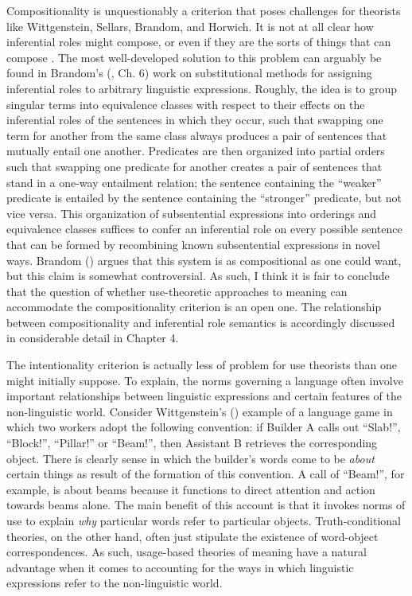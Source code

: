 Compositionality is unquestionably a criterion that poses challenges for theorists like Wittgenstein, Sellars, Brandom, and Horwich. It is not at all clear how inferential roles might compose, or even if they are the sorts of things that can compose \citep{FodorLepore:1991}. The most well-developed solution to this problem can arguably be found in Brandom's (\citeyear{Brandom:1994}, Ch. 6) work on substitutional methods for assigning inferential roles to arbitrary linguistic expressions. Roughly, the idea is to group singular terms into equivalence classes with respect to their effects on the inferential roles of the sentences in which they occur, such that swapping one term for another from the same class always produces a pair of sentences that mutually entail one another. Predicates are then organized into partial orders such that swapping one predicate for another creates a pair of sentences that stand in a one-way entailment relation; the sentence containing the ``weaker'' predicate is entailed by the sentence containing the ``stronger'' predicate, but not vice versa. This organization of subsentential expressions into orderings and equivalence classes suffices to confer an inferential role on every possible sentence that can be formed by recombining known subsentential expressions in novel ways. Brandom (\citeyear{Brandom:1994}) argues that this system is as compositional as one could want, but this claim is somewhat controversial. As such, I think it is fair to conclude that the question of whether use-theoretic approaches to meaning can accommodate the compositionality criterion is an open one. The relationship between compositionality and inferential role semantics is accordingly discussed in considerable detail in Chapter 4.

The intentionality criterion is actually less of problem for use theorists than one might initially suppose. To explain, the norms governing a language often involve important relationships between linguistic expressions and certain features of the non-linguistic world. Consider Wittgenstein's (\citeyear{Wittgenstein:1953}) example of a language game in which two workers adopt the following convention: if Builder A calls out ``Slab!'', ``Block!'', ``Pillar!'' or ``Beam!'', then Assistant B retrieves the corresponding object. There is clearly sense in which the builder's words come to be \textit{about} certain things as result of the formation of this convention. A call of ``Beam!'', for example, is about beams because it functions to direct attention and action towards beams alone. The main benefit of this account is that it invokes norms of use to explain \textit{why} particular words refer to particular objects. Truth-conditional theories, on the other hand, often just stipulate the existence of word-object correspondences. As such, usage-based theories of meaning have a natural advantage when it comes to accounting for the ways in which linguistic expressions refer to the non-linguistic world. 


